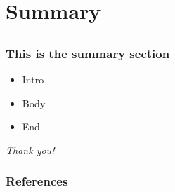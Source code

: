 \documentclass[aspectratio=169]{beamer}
\begin{document}
\section{Summary}
\subsection{}

\begin{frame}
	\frametitle{This is the summary section}
	\begin{itemize}
	    \item Intro
	    \item Body 
	    \item End
	\end{itemize}
	
	\vspace{10mm}
	\Large
	\hfill\textit{Thank you!}
\end{frame}

\begin{frame}
	\frametitle{References}
	
	\nocite{*}
	
\end{frame}
\end{document}
